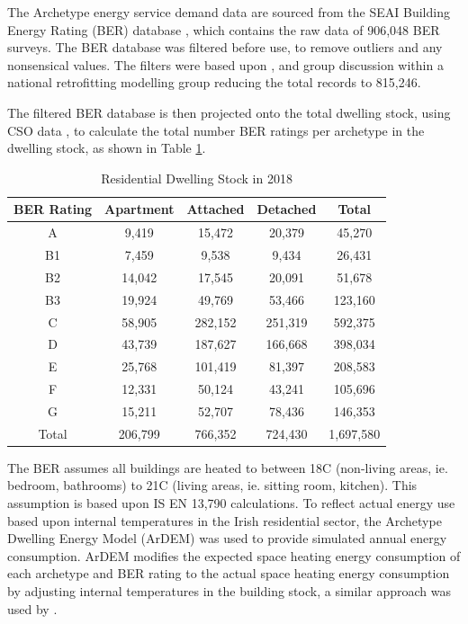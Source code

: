 \documentclass[journal abbreviation, manuscript]{copernicus}
\begin{document}
The Archetype energy service demand data are sourced from the SEAI Building Energy Rating (BER) database \citep{SustainableEnergyAuthorityofIreland}, which contains the raw data of 906,048 BER surveys. The BER database was filtered before use, to remove outliers and any nonsensical values. The filters were based upon \citet{Dineen2015}, \citet{Uidhir2020a} and group discussion within a national retrofitting modelling group \citep{NationalRetrofittingModellingGroup} reducing the total records to 815,246.

The filtered BER database is then projected onto the total dwelling stock, using CSO data \citep{CentralStatisticsOffice2020a} , \citep{CentralStatisticsOffice2020b} to calculate the total number BER ratings per archetype in the dwelling stock, as shown in Table \ref{Residential Dwelling Stock}. 

\begin{table}[h!]
 \centering
 \footnotesize
 \caption{Residential Dwelling Stock in 2018}
 \begin{tabular}{ccccc}
 \hline 
 BER Rating & Apartment & Attached & Detached & Total \\ 
 \hline
 A & 9,419 &	15,472 &	20,379 &	45,270 \\
 B1 & 7,459 &	9,538 &	9,434 &	26,431 \\
 B2	& 14,042 &	17,545 &	20,091 &	51,678 \\
 B3 & 19,924 &	49,769 &	53,466 &	123,160 \\
 C & 58,905	& 282,152 &	251,319	& 592,375 \\
 D & 43,739 &	187,627 &	166,668	& 398,034 \\
 E & 25,768 &	101,419 & 	81,397 & 	208,583 \\
 F & 12,331 &	50,124 &	43,241 &	105,696 \\
 G & 15,211 &	52,707 &	78,436 &	146,353 \\
 Total & 206,799 &	766,352	& 724,430 &	1,697,580 \\ \hline 
 \end{tabular}
 \label{Residential Dwelling Stock}
\end{table}

The BER assumes all buildings are heated to between 18\textdegree C (non-living areas, ie. bedroom, bathrooms) to 21\textdegree C (living areas, ie. sitting room, kitchen). This assumption is based upon IS EN 13,790 calculations. To reflect actual energy use based upon internal temperatures in the Irish residential sector, the Archetype Dwelling Energy Model (ArDEM) \citep{Dineen2015} was used to provide simulated annual energy consumption. ArDEM modifies the expected space heating energy consumption of each archetype and BER rating to the actual space heating energy consumption by adjusting internal temperatures in the building stock, a similar approach was used by \citet{Uidhir2020}.
\end{document}
